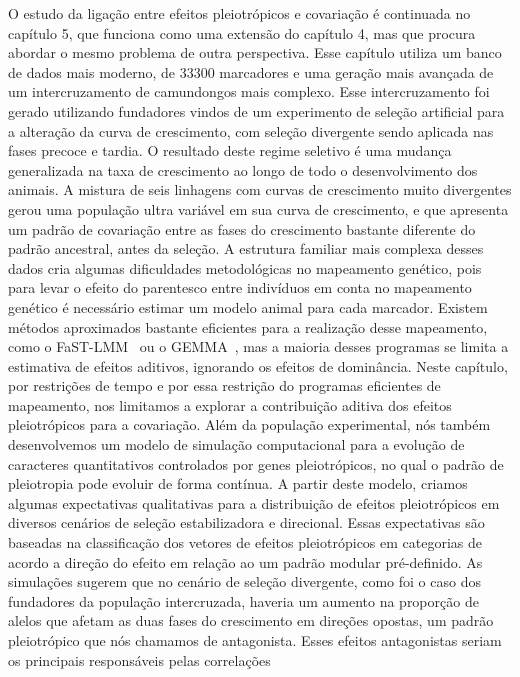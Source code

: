 \begin{refsection}
O estudo da ligação entre efeitos pleiotrópicos e covariação é continuada no
capítulo 5, que funciona como uma extensão do capítulo 4, mas que procura
abordar o mesmo problema de outra perspectiva. Esse capítulo utiliza um banco
de dados mais moderno, de 33300 marcadores e uma geração mais avançada
de um intercruzamento de camundongos mais complexo. Esse intercruzamento foi
gerado utilizando fundadores vindos de um experimento de seleção artificial
para a alteração da curva de crescimento, com seleção divergente sendo
aplicada nas fases precoce e tardia. O resultado deste regime seletivo é uma
mudança generalizada na taxa de crescimento ao longo de todo o desenvolvimento
dos animais. A mistura de seis linhagens com curvas de crescimento muito
divergentes gerou uma população ultra variável em sua curva de crescimento, e
que apresenta um padrão de covariação entre as fases do crescimento bastante
diferente do padrão ancestral, antes da seleção. A estrutura familiar mais
complexa desses dados cria algumas dificuldades metodológicas no mapeamento
genético, pois para levar o efeito do parentesco entre indivíduos em conta no
mapeamento genético é necessário estimar um modelo animal para cada marcador.
Existem métodos aproximados bastante eficientes para a realização desse
mapeamento, como o FaST-LMM~\parencite{Lippert2011-jn} ou o
GEMMA~\parencite{Zhou2012-zl}, mas a maioria desses programas se limita a
estimativa de efeitos aditivos, ignorando os efeitos de dominância. Neste
capítulo, por restrições de tempo e por essa restrição do programas eficientes
de mapeamento, nos limitamos a explorar a contribuição aditiva dos efeitos
pleiotrópicos para a covariação. Além da população experimental, nós também
desenvolvemos um modelo de simulação computacional para a evolução de
caracteres quantitativos controlados por genes pleiotrópicos, no qual o padrão
de pleiotropia pode evoluir de forma contínua. A partir deste modelo, 
criamos algumas expectativas qualitativas para a distribuição de efeitos
pleiotrópicos em diversos cenários de seleção estabilizadora e direcional.
Essas expectativas são baseadas na classificação dos vetores de efeitos
pleiotrópicos em categorias de acordo a direção do efeito em relação ao um
padrão modular pré-definido. As simulações sugerem que no cenário de seleção
divergente, como foi o caso dos fundadores da população intercruzada, haveria
um aumento na proporção de alelos que afetam as duas fases do crescimento em
direções opostas, um padrão pleiotrópico que nós chamamos de antagonista.
Esses efeitos antagonistas seriam os principais responsáveis pelas correlações

\end{refsection}
